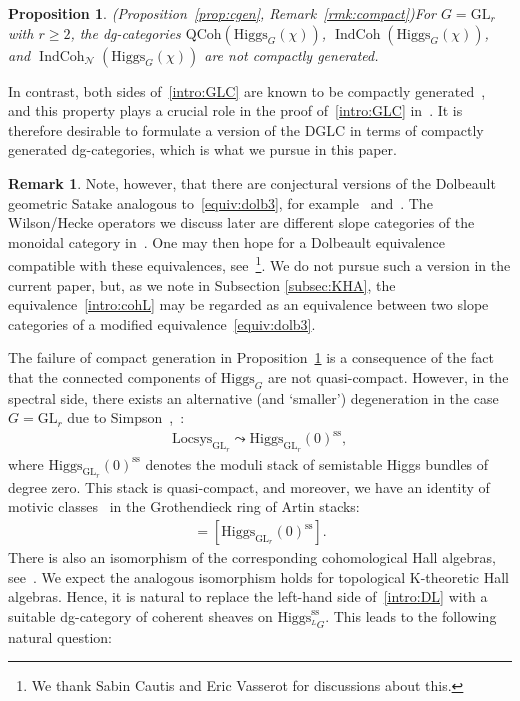 \documentclass [11pt,oneside,a4paper,mathscr]{amsart}
\newtheorem{prop}[thm]{Proposition}
\theoremstyle{definition}
\newtheorem{remark}[thm]{Remark}
\renewcommand{\geq}{\geqslant}
\newcommand{\IndCoh}{\operatorname{IndCoh}}
\newcommand{\GL}{\operatorname{GL}}
\newcommand{\Hig}{\mathrm{Higgs}}
\begin{document}
\begin{prop}\emph{(Proposition~\ref{prop:cgen}, Remark~\ref{rmk:compact})}\label{intro:prop:cpt} For $G = \mathrm{GL}_r$ with $r \geq 2$, the dg-categories
$\mathrm{QCoh}(\Hig_G(\chi))$, $\IndCoh(\Hig_G(\chi))$, and
$\IndCoh_{\mathcal{N}}(\Hig_G(\chi))$ are not compactly generated. \end{prop}

In contrast, both sides of~\eqref{intro:GLC} are known to be compactly generated~\cite{MR3037900, DGbun}, and this property plays a crucial role in the proof of~\eqref{intro:GLC} in~\cite{GLC1, GLC2, GLC3, GLC4, GLC5}.
It is therefore desirable to formulate a version of the DGLC in terms of compactly generated dg-categories, which is what we pursue in this paper. 

\begin{remark}\label{remark:newDolb}
Note, however, that there are conjectural versions of the Dolbeault geometric Satake analogous to~\eqref{equiv:dolb3}, for example~\cite[Section 7.9]{BFM} and~\cite[Conjecture 1.6]{CW}. 
The Wilson/Hecke operators we discuss later are different slope categories of the monoidal category in~\cite[Conjecture 1.6]{CW}.
One may then hope for a Dolbeault equivalence compatible with these equivalences, see~\cite{KapWit}\footnote{We thank Sabin Cautis and Eric Vasserot for discussions about this.}. We do not pursue such a version in the current paper, but, as we note in Subsection \ref{subsec:KHA}, the equivalence~\eqref{intro:cohL} may be regarded as an equivalence between two slope categories of a modified equivalence~\eqref{equiv:dolb3}.\end{remark}

The failure of compact generation in Proposition~\ref{intro:prop:cpt} is a consequence of the fact that the connected components of $\Hig_G$ are not quasi-compact.
However, in the spectral side, there exists an alternative (and `smaller') degeneration in the case $G = \mathrm{GL}_r$ due to Simpson~\cite[Proposition~4.1]{Simp},~\cite[Theorem~2.5]{Simp2}: \begin{align}\label{intro:degss} \mathrm{Locsys}_{\mathrm{GL}_r} \leadsto \Hig_{\GL_r}(0)^{\mathrm{ss}}, \end{align} where $\Hig_{\GL_r}(0)^{\mathrm{ss}}$ denotes the moduli stack of semistable Higgs bundles of degree zero.
This stack is quasi-compact, and moreover, we have an identity of motivic classes~\cite[Theorem~1.2.1]{FeSoSo} in the Grothendieck ring of Artin stacks:
\begin{align*} [\mathrm{Locsys}_{\mathrm{GL}_r}] = [\Hig_{\GL_r}(0)^{\mathrm{ss}}]. \end{align*} 
There is also an isomorphism of the corresponding cohomological Hall algebras, see~\cite[Theorem~1.8]{Henn}. We expect the analogous isomorphism holds for topological K-theoretic Hall algebras.
Hence, it is natural to replace the left-hand side of~\eqref{intro:DL} with a suitable dg-category of coherent sheaves on $\Hig^{\mathrm{ss}}_{^{L}G}$.
This leads to the following natural question:
\end{document}

